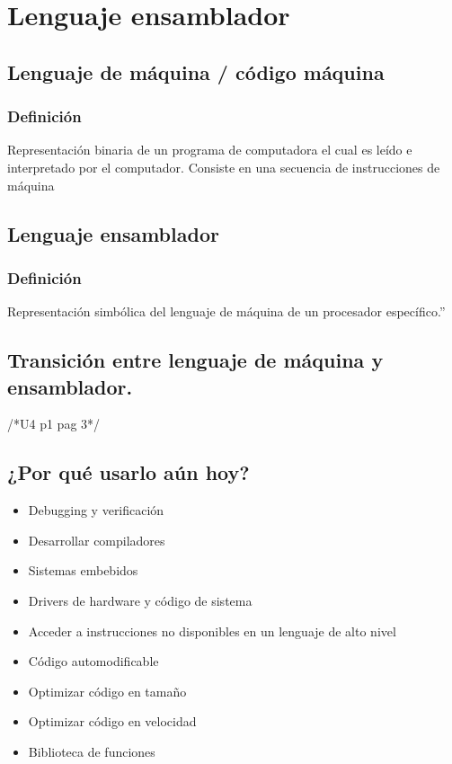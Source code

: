 \section{Lenguaje ensamblador}

\subsection{Lenguaje de máquina / código máquina}
	\subsubsection{Definición}
	Representación binaria de un programa de computadora el cual es leído e interpretado por el computador. Consiste en una secuencia de instrucciones de máquina
	
\subsection{Lenguaje ensamblador}
	\subsubsection{Definición}
	Representación simbólica del lenguaje de máquina de un procesador específico.”

\subsection{Transición entre lenguaje de máquina y ensamblador.}
/*U4 p1 pag 3*/

\subsection{¿Por qué usarlo aún hoy?}
	\begin{itemize}	
	\item Debugging y verificación
	\item Desarrollar compiladores
	\item Sistemas embebidos
	\item Drivers de hardware y código de sistema
	\item Acceder a instrucciones no disponibles en un lenguaje de alto nivel
	\item Código automodificable
	\item Optimizar código en tamaño
	\item Optimizar código en velocidad
	\item Biblioteca de funciones
	\end{itemize}	
	
